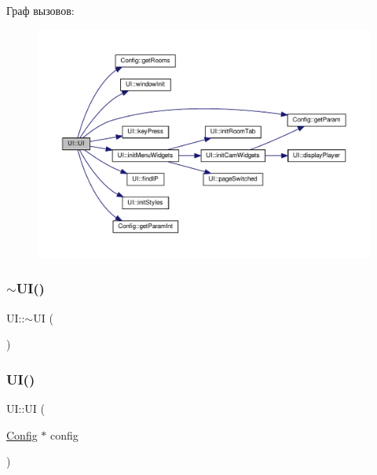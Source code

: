Граф вызовов\+:\nopagebreak
\begin{figure}[H]
\begin{center}
\leavevmode
\includegraphics[width=350pt]{class_u_i_a2b49119b809785f66dd97ce769ab1753_cgraph}
\end{center}
\end{figure}
\mbox{\label{class_u_i_a1b23d0c64c7cbb3d143d90ec532a7ccd}} 
\subsubsection{\texorpdfstring{$\sim$\+U\+I()}{~UI()}\hspace{0.1cm}{\footnotesize\ttfamily [1/2]}}
{\footnotesize\ttfamily U\+I\+::$\sim$\+UI (\begin{DoxyParamCaption}{ }\end{DoxyParamCaption})}

\mbox{\label{class_u_i_a2b49119b809785f66dd97ce769ab1753}} 
\subsubsection{\texorpdfstring{U\+I()}{UI()}\hspace{0.1cm}{\footnotesize\ttfamily [2/2]}}
{\footnotesize\ttfamily U\+I\+::\+UI (\begin{DoxyParamCaption}\item[{\hyperlink{class_config}{Config} $\ast$}]{config }\end{DoxyParamCaption})}

